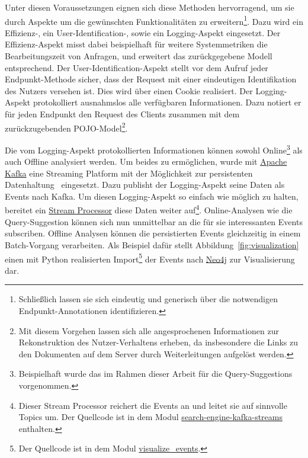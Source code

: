 Unter diesen Voraussetzungen eignen sich diese Methoden hervorragend,
um sie durch Aspekte um die gewünschten Funktionalitäten zu erweitern\footnote{Schließlich lassen
sie sich eindeutig und generisch über die notwendigen Endpunkt-Annotationen
identifizieren.}.
Dazu wird ein Effizienz-, ein User-Identification-, sowie ein Logging-Aspekt eingesetzt.
Der Effizienz-Aspekt misst dabei beispielhaft für weitere Systemmetriken die Bearbeitungszeit von Anfragen,
und erweitert das zurückgegebene Modell entsprechend.
Der User-Identification-Aspekt stellt
vor dem Aufruf jeder Endpunkt-Methode sicher, dass der Request mit einer
eindeutigen Identifikation des Nutzers versehen ist.
Dies wird über einen Cookie realisiert.
Der Logging-Aspekt protokolliert ausnahmslos alle verfügbaren Informationen.
Dazu notiert er für jeden Endpunkt den Request des Clients zusammen mit dem zurückzugebenden
POJO-Model\footnote{Mit diesem Vorgehen lassen sich alle angesprochenen Informationen zur Rekonstruktion des Nutzer-Verhaltens erheben,
da insbesondere die Links zu den Dokumenten auf dem Server durch Weiterleitungen aufgelöst werden.}.

Die vom Logging-Aspekt protokollierten Informationen können sowohl
Online\footnote{Beispielhaft wurde das im Rahmen dieser Arbeit für die Query-Suggestions vorgenommen.}
als auch Offline analysiert werden.
Um beides zu ermöglichen, wurde mit \href{https://kafka.apache.org/}{Apache Kafka}
eine Streaming Platform mit der Möglichkeit zur persistenten Datenhaltung~\cite{kafka.foreword} eingesetzt.
Dazu publisht der Logging-Aspekt seine Daten als Events nach Kafka.
Um diesen Logging-Aspekt so einfach wie möglich zu halten, bereitet ein
\href{https://www.confluent.io/blog/introducing-kafka-streams-stream-processing-made-simple/}{Stream Processor}
diese Daten weiter auf\footnote{Dieser Stream Processor reichert die Events an und leitet sie
auf sinnvolle Topics um. Der Quellcode ist in dem Modul 
\href{https://github.com/mam10eks/search-homepage-of-university-leipzig/tree/master/search-engine-kafka-streams}
{search-engine-kafka-streams} enthalten.}.
Online-Analysen wie die Query-Suggestion können sich nun unmittelbar an die für sie interessanten Events subscriben.
Offline Analysen können die persistierten Events gleichzeitig in einem  Batch-Vorgang verarbeiten.
Als Beispiel dafür stellt Abbildung~\ref{fig:visualization} einen mit Python realisierten
Import\footnote{Der Quellcode ist in dem Modul
\href{https://github.com/mam10eks/search-homepage-of-university-leipzig/tree/master/visualize_events}{visualize\_events}.}
der Events nach \href{https://de.wikipedia.org/wiki/Neo4j}{Neo4j} zur Visualisierung dar.

